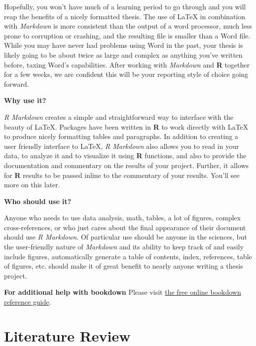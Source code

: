 \documentclass[12pt,twoside]{reedthesis}
\begin{document}
Hopefully, you won't have much of a learning period to go through and you will reap the benefits of a nicely formatted thesis. The use of LaTeX in combination with \emph{Markdown} is more consistent than the output of a word processor, much less prone to corruption or crashing, and the resulting file is smaller than a Word file. While you may have never had problems using Word in the past, your thesis is likely going to be about twice as large and complex as anything you've written before, taxing Word's capabilities. After working with \emph{Markdown} and \textbf{R} together for a few weeks, we are confident this will be your reporting style of choice going forward.

\textbf{Why use it?}

\emph{R Markdown} creates a simple and straightforward way to interface with the beauty of LaTeX. Packages have been written in \textbf{R} to work directly with LaTeX to produce nicely formatting tables and paragraphs. In addition to creating a user friendly interface to LaTeX, \emph{R Markdown} also allows you to read in your data, to analyze it and to visualize it using \textbf{R} functions, and also to provide the documentation and commentary on the results of your project. Further, it allows for \textbf{R} results to be passed inline to the commentary of your results. You'll see more on this later.

\textbf{Who should use it?}

Anyone who needs to use data analysis, math, tables, a lot of figures, complex cross-references, or who just cares about the final appearance of their document should use \emph{R Markdown}. Of particular use should be anyone in the sciences, but the user-friendly nature of \emph{Markdown} and its ability to keep track of and easily include figures, automatically generate a table of contents, index, references, table of figures, etc. should make it of great benefit to nearly anyone writing a thesis project.

\textbf{For additional help with bookdown}
Please visit \href{https://bookdown.org/yihui/bookdown/}{the free online bookdown reference guide}.

\hypertarget{lit-review}{%
\chapter{Literature Review}\label{lit-review}}
\end{document}
